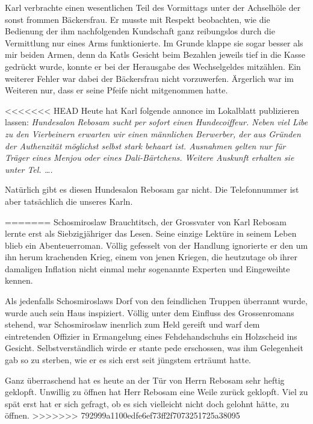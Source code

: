 Karl verbrachte einen wesentlichen Teil des Vormittags unter der Achselhöle der sonst frommen Bäckersfrau. Er musste mit Respekt beobachten, wie die Bedienung der ihm nachfolgenden Kundschaft ganz reibungslos durch die Vermittlung nur eines Arms funktionierte. Im Grunde klappe sie sogar besser als mir beiden Armen, denn da Katls Gesicht beim Bezahlen jeweils tief in die Kasse gedrückt wurde, konnte er bei der Herausgabe des Wechselgeldes mitzählen. Ein weiterer Fehler war dabei der Bäckersfrau nicht vorzuwerfen. Ärgerlich war im Weiteren nur, dass er seine Pfeife nicht mitgenommen hatte.
\begin{center}
{\huge \textthing}
\end{center}
<<<<<<< HEAD
Heute hat Karl folgende annonce im Lokalblatt publizieren lassen: {\it Hundesalon Rebosam sucht per sofort einen Hundecoiffeur. Neben viel Libe zu den Vierbeinern erwarten wir einen männlichen Berwerber, der aus Gründen der Authenzität möglichst selbst stark behaart ist. Ausnahmen gelten nur für Träger eines Menjou oder eines Dali-Bärtchens. Weitere Auskunft erhalten sie unter Tel. \ldots. }

Natürlich gibt es diesen Hundesalon Rebosam gar nicht. Die Telefonnummer ist aber tatsächlich die unseres Karln.
\begin{center}
{\huge \textthing}
\end{center}
=======
Schosmiroslaw Brauchtitsch, der Grossvater von Karl Rebosam lernte erst als Siebzigjähriger das Lesen. Seine einzige Lektüre in seinem Leben blieb ein Abenteuerroman. Völlig gefesselt von der Handlung ignorierte er den um ihn herum krachenden Krieg, einem von jenen Kriegen, die heutzutage ob ihrer damaligen Inflation nicht einmal mehr sogenannte Experten und Eingeweihte kennen. 

Als jedenfalls Schosmiroslaws Dorf von den feindlichen Truppen überrannt wurde, wurde auch sein Haus inspiziert. Völlig unter dem Einfluss des Grossenromans stehend, war Schosmiroslaw inenrlich zum Held gereift und warf dem eintretenden Offizier in Ermangelung eines Fehdehandschuhs ein Holzscheid ins Gesicht. Selbstverständlich wirde er stante pede erschossen, was ihm Gelegenheit gab so zu sterben, wie er es sich erst seit jüngstem erträumt hatte.
\begin{center}
{\huge \textthing}
\end{center}
Ganz überraschend hat es heute an der Tür von Herrn Rebosam sehr heftig geklopft. Unwillig zu öffnen hat Herr Rebosam eine Weile zurück geklopft. Viel zu spät erst hat er sich gefragt, ob es sich vielleicht nicht doch gelohnt hätte, zu öffnen.
>>>>>>> 792999a1100edfe6ef73ff2f7073251725a38095
\hfill {\color{red}\decofourleft}

